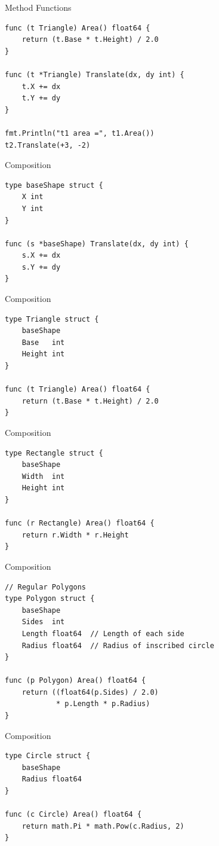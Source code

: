 \documentclass[pdf]{beamer}
\begin{document}
\begin{frame}[fragile]{Method Functions}
\begin{lstlisting}
func (t Triangle) Area() float64 {
    return (t.Base * t.Height) / 2.0
}

func (t *Triangle) Translate(dx, dy int) {
    t.X += dx
    t.Y += dy
}

fmt.Println("t1 area =", t1.Area())
t2.Translate(+3, -2)
\end{lstlisting}
\end{frame}

\begin{frame}[fragile]{Composition}
\begin{lstlisting}
type baseShape struct {
    X int
    Y int
}

func (s *baseShape) Translate(dx, dy int) {
    s.X += dx
    s.Y += dy
}
\end{lstlisting}
\end{frame}

\begin{frame}[fragile]{Composition}
\begin{lstlisting}
type Triangle struct {
    baseShape
    Base   int
    Height int
}

func (t Triangle) Area() float64 {
    return (t.Base * t.Height) / 2.0
}
\end{lstlisting}
\end{frame}

\begin{frame}[fragile]{Composition}
\begin{lstlisting}
type Rectangle struct {
    baseShape
    Width  int
    Height int
}

func (r Rectangle) Area() float64 {
    return r.Width * r.Height
}
\end{lstlisting}
\end{frame}

\begin{frame}[fragile]{Composition}
\begin{lstlisting}
// Regular Polygons
type Polygon struct {
    baseShape
    Sides  int
    Length float64  // Length of each side
    Radius float64  // Radius of inscribed circle
}

func (p Polygon) Area() float64 {
    return ((float64(p.Sides) / 2.0) 
            * p.Length * p.Radius)
}
\end{lstlisting}
\end{frame}

\begin{frame}[fragile]{Composition}
\begin{lstlisting}
type Circle struct {
    baseShape
    Radius float64
}

func (c Circle) Area() float64 {
    return math.Pi * math.Pow(c.Radius, 2)
}
\end{lstlisting}
\end{frame}
\end{document}
